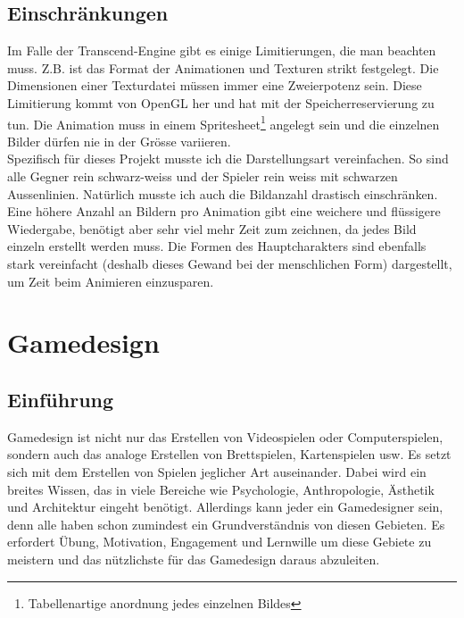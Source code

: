 \documentclass[12pt,a4paper,titlepage]{article}
\begin{document}
	\subsection{Einschränkungen}
		Im Falle der Transcend-Engine gibt es einige Limitierungen, die man beachten muss. Z.B. ist das Format der Animationen und Texturen strikt festgelegt. Die Dimensionen einer Texturdatei müssen immer eine Zweierpotenz sein. Diese Limitierung kommt von OpenGL her und hat mit der Speicherreservierung zu tun. Die Animation muss in einem Spritesheet\footnote{Tabellenartige anordnung jedes einzelnen Bildes} angelegt sein und die einzelnen Bilder dürfen nie in der Grösse variieren.\\
		
		Spezifisch für dieses Projekt musste ich die Darstellungsart vereinfachen. So sind alle Gegner rein schwarz-weiss und der Spieler rein weiss mit schwarzen Aussenlinien. Natürlich musste ich auch die Bildanzahl drastisch einschränken. Eine höhere Anzahl an Bildern pro Animation gibt eine weichere und flüssigere Wiedergabe, benötigt aber sehr viel mehr Zeit zum zeichnen, da jedes Bild einzeln erstellt werden muss. Die Formen des Hauptcharakters sind ebenfalls stark vereinfacht (deshalb dieses Gewand bei der menschlichen Form) dargestellt, um Zeit beim Animieren einzusparen.\\
		

\section{Gamedesign}
	\subsection{Einführung}
		Gamedesign ist nicht nur das Erstellen von Videospielen oder Computerspielen, sondern auch das analoge Erstellen von Brettspielen, Kartenspielen usw. Es setzt sich mit dem Erstellen von Spielen jeglicher Art auseinander. Dabei wird ein breites Wissen, das in viele Bereiche wie Psychologie, Anthropologie, Ästhetik und Architektur eingeht benötigt. Allerdings kann jeder ein Gamedesigner sein, denn alle haben schon zumindest ein Grundverständnis von diesen Gebieten. Es erfordert Übung, Motivation, Engagement und Lernwille um diese Gebiete zu meistern und das nützlichste für das Gamedesign daraus abzuleiten.\\
		
\end{document}
